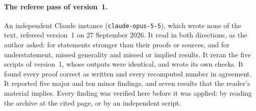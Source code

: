 \paragraph{The referee pass of version~1.}
An independent Claude instance (\texttt{claude-opus-5-5}), which wrote none of the text, refereed version~1 on 27 September 2026. It read in both directions, as the author asked: for statements stronger than their proofs or sources, and for understatement, missed generality and missed or implied results. It reran the five scripts of version~1, whose outputs were identical, and wrote its own checks. It found every proof correct as written and every recomputed number in agreement. It reported five major and ten minor findings, and seven results that the reader's material implies. Every finding was verified here before it was applied: by reading the archive at the cited page, or by an independent script.
